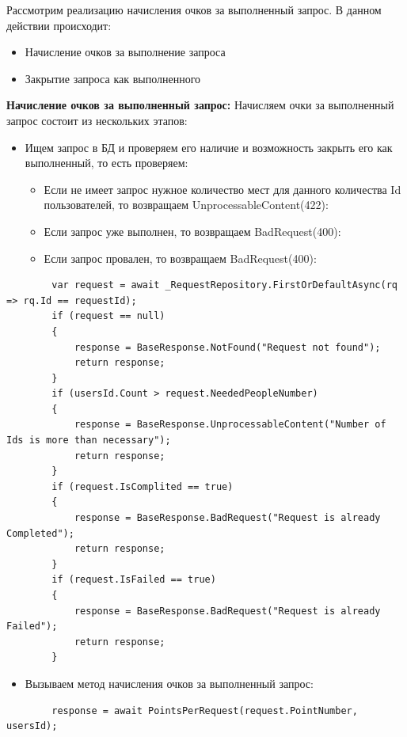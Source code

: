 Рассмотрим реализацию начисления очков за выполненный запрос. В данном действии происходит:
\begin{itemize}
	\item{Начисление очков за выполнение запроса}
	\item{Закрытие запроса как выполненного}
\end{itemize}

\textbf{Начисление очков за выполненный запрос:} Начисляем очки за выполненный запрос состоит из нескольких этапов:

\begin{itemize}
	\item{Ищем запрос в БД и проверяем его наличие и возможность закрыть его как выполненный, то есть проверяем:
			\begin{itemize}
				\item{Если не имеет запрос нужное количество мест для данного количества Id пользователей, то возвращаем UnprocessableContent(422):}
				\item{Если запрос уже выполнен, то возвращаем BadRequest(400):}
				\item{Если запрос провален, то возвращаем BadRequest(400):}
			\end{itemize}
		}
\end{itemize}
\begin{verbatim}
        var request = await _RequestRepository.FirstOrDefaultAsync(rq => rq.Id == requestId);
        if (request == null)
        {
            response = BaseResponse.NotFound("Request not found");
            return response;
        }
        if (usersId.Count > request.NeededPeopleNumber)
        {
            response = BaseResponse.UnprocessableContent("Number of Ids is more than necessary");
            return response;
        }
        if (request.IsComplited == true)
        {
            response = BaseResponse.BadRequest("Request is already Completed");
            return response;
        }
        if (request.IsFailed == true)
        {
            response = BaseResponse.BadRequest("Request is already Failed");
            return response;
        }
\end{verbatim}

\begin{itemize}
	\item{Вызываем метод начисления очков за выполненный запрос:}
\end{itemize}
\begin{verbatim}
        response = await PointsPerRequest(request.PointNumber, usersId);
\end{verbatim}

